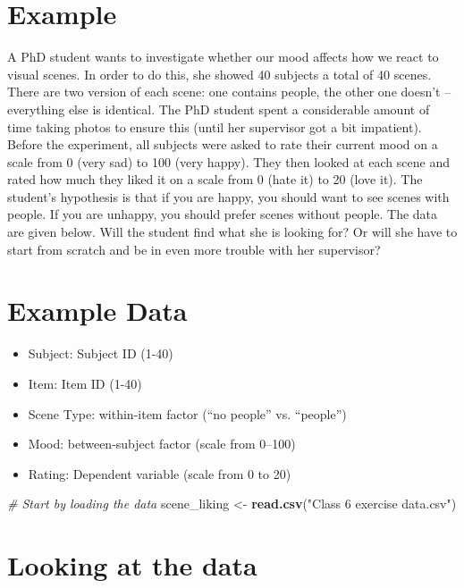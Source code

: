 \documentclass[]{article}
\newenvironment{Shaded}{}{}
\newcommand{\KeywordTok}[1]{\textcolor[rgb]{0.00,0.44,0.13}{\textbf{{#1}}}}
\newcommand{\StringTok}[1]{\textcolor[rgb]{0.25,0.44,0.63}{{#1}}}
\newcommand{\CommentTok}[1]{\textcolor[rgb]{0.38,0.63,0.69}{\textit{{#1}}}}
\newcommand{\NormalTok}[1]{{#1}}
\begin{document}
\section{Example}\label{example-4}

A PhD student wants to investigate whether our mood affects how we react
to visual scenes. In order to do this, she showed 40 subjects a total of
40 scenes. There are two version of each scene: one contains people, the
other one doesn't -- everything else is identical. The PhD student spent
a considerable amount of time taking photos to ensure this (until her
supervisor got a bit impatient). Before the experiment, all subjects
were asked to rate their current mood on a scale from 0 (very sad) to
100 (very happy). They then looked at each scene and rated how much they
liked it on a scale from 0 (hate it) to 20 (love it). The student's
hypothesis is that if you are happy, you should want to see scenes with
people. If you are unhappy, you should prefer scenes without people. The
data are given below. Will the student find what she is looking for? Or
will she have to start from scratch and be in even more trouble with her
supervisor?

\section{Example Data}\label{example-data-1}

\begin{itemize}
\itemsep1pt\parskip0pt
\item
  Subject: Subject ID (1-40)
\item
  Item: Item ID (1-40)
\item
  Scene Type: within-item factor (``no people'' vs. ``people'')
\item
  Mood: between-subject factor (scale from 0--100)
\item
  Rating: Dependent variable (scale from 0 to 20)
\end{itemize}

\begin{Shaded}
\begin{Highlighting}[]
\CommentTok{# Start by loading the data}
\NormalTok{scene_liking <-}\StringTok{ }\KeywordTok{read.csv}\NormalTok{(}\StringTok{"Class 6 exercise data.csv"}\NormalTok{)}
\end{Highlighting}
\end{Shaded}

\section{Looking at the data}\label{looking-at-the-data}
\end{document}
